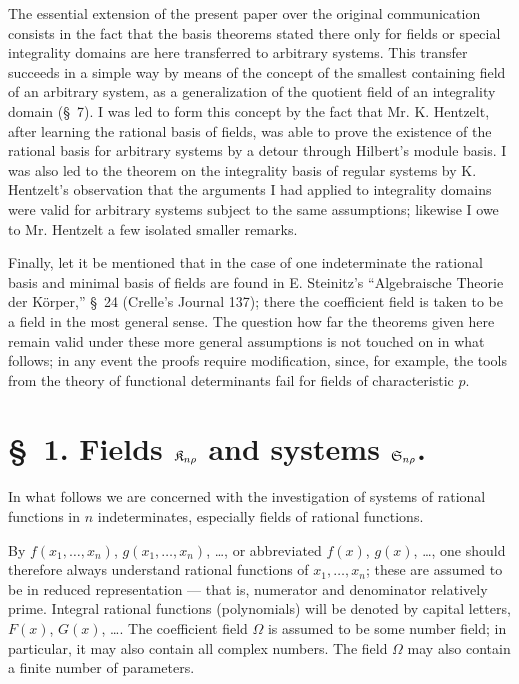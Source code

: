 \documentclass[11pt]{article}
\begin{document}
The essential extension of the present paper over the original communication consists in the fact that the basis theorems stated there only for fields or special integrality domains are here transferred to arbitrary systems. This transfer succeeds in a simple way by means of the concept of the smallest containing field of an arbitrary system, as a generalization of the quotient field of an integrality domain (\S\ 7). I was led to form this concept by the fact that Mr. K. Hentzelt, after learning the rational basis of fields, was able to prove the existence of the rational basis for arbitrary systems by a detour through Hilbert's module basis. I was also led to the theorem on the integrality basis of regular systems by K. Hentzelt's observation that the arguments I had applied to integrality domains were valid for arbitrary systems subject to the same assumptions; likewise I owe to Mr. Hentzelt a few isolated smaller remarks.

Finally, let it be mentioned that in the case of one indeterminate the rational basis and minimal basis of fields are found in E. Steinitz's ``Algebraische Theorie der Körper,'' \S\ 24 (Crelle's Journal 137); there the coefficient field is taken to be a field in the most general sense. The question how far the theorems given here remain valid under these more general assumptions is not touched on in what follows; in any event the proofs require modification, since, for example, the tools from the theory of functional determinants fail for fields of characteristic $p$.

\section*{\S\ 1. Fields $\mathfrak{K}_{n\rho}$ and systems $\mathfrak{S}_{n\rho}$.}

In what follows we are concerned with the investigation of systems of rational functions in $n$ indeterminates, especially fields of rational functions.

By $f(x_1,\ldots,x_n)$, $g(x_1,\ldots,x_n)$, \ldots, or abbreviated $f(x)$, $g(x)$, \ldots, one should therefore always understand rational functions of $x_1,
\ldots,x_n$; these are assumed to be in reduced representation --- that is, numerator and denominator relatively prime. Integral rational functions (polynomials) will be denoted by capital letters, $F(x)$, $G(x)$, \ldots. The coefficient field $\Omega$ is assumed to be some number field; in particular, it may also contain all complex numbers. The field $\Omega$ may also contain a finite number of parameters.
\end{document}
